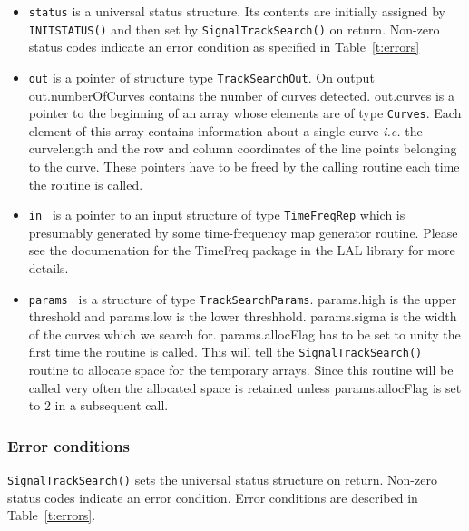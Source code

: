 \begin{itemize}
\item 
{\tt status\/} is a universal status structure. 
Its contents are initially assigned by {\tt INITSTATUS()\/} and then 
set by {\tt SignalTrackSearch()\/} on return. 
Non-zero status codes indicate an error condition as specified in 
Table~\ref{t:errors}
\item{\tt out\/} is a pointer of structure type {\tt TrackSearchOut}.
On output out.numberOfCurves contains the number of curves 
detected. out.curves is a pointer to the beginning of an 
array whose elements are of type {\tt Curves\/}. Each element of this 
array contains information about a single curve {\em i.e.} the
curvelength and the row and column coordinates of the line points
belonging to the curve. These pointers have to be freed by the calling
routine each time the routine is called.
\item {\tt in \/} is a pointer to an input structure of type 
{\tt TimeFreqRep} which is
presumably generated by some time-frequency map generator routine.
Please see the documenation for the TimeFreq package in the LAL
library for more details.
\item 
{\tt params \/} is a structure of type {\tt TrackSearchParams\/}.
params.high is the upper threshold and params.low is the lower
threshhold. params.sigma is the width of the curves which we search
for. params.allocFlag has to be set to unity the first time the
routine is called. This will tell the {\tt SignalTrackSearch()\/}
routine to allocate space for the temporary arrays. Since this routine
will be called very often the allocated space is retained unless 
params.allocFlag is set to 2 in a subsequent call.
\end{itemize}

\subsubsection{Error conditions}

{\tt SignalTrackSearch()\/} sets the universal status structure on return. 
Non-zero status codes indicate an error condition. 
Error conditions are described in Table~\ref{t:errors}.

